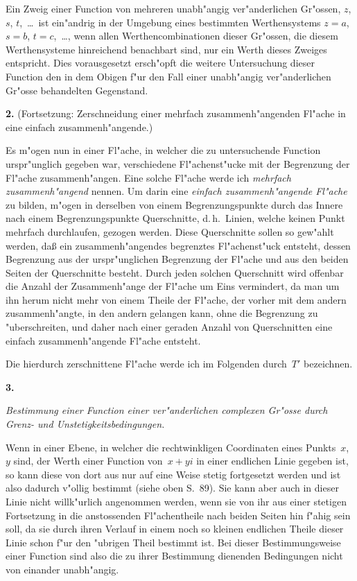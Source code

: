 \documentclass[12pt,a4paper]{article}
\begin{document}
Ein Zweig einer Function von mehreren unabh"angig ver"anderlichen
Gr"ossen, $z$, $s$, $t$,\ \ldots\ ist ein"andrig in der Umgebung eines bestimmten
Werthensystems $z = a$, $s = b$, $t = c$,\ \ldots, wenn allen Werthencombinationen dieser Gr"ossen, die diesem Werthensysteme hinreichend benachbart
sind, nur ein Werth dieses Zweiges entspricht. Dies vorausgesetzt
ersch"opft die weitere Untersuchung dieser Function den in dem Obigen
f"ur den Fall einer unabh"angig ver"anderlichen Gr"osse behandelten
Gegenstand.

\medskip
\textbf{2.} (Fortsetzung: Zerschneidung einer mehrfach zusammenh"angenden
Fl"ache in eine einfach zusammenh"angende.)

Es m"ogen nun in einer Fl"ache, in welcher die zu untersuchende
Function urspr"unglich gegeben war, verschiedene Fl"achenst"ucke mit der
Begrenzung der Fl"ache zusammenh"angen. Eine solche Fl"ache werde
ich \emph{mehrfach zusammenh"angend} nennen. Um darin eine
\emph{einfach zusammenh"angende Fl"ache} zu bilden, m"ogen in derselben
von einem Begrenzungspunkte durch das Innere nach einem Begrenzungspunkte
Querschnitte, d.\,h.\ Linien, welche keinen Punkt mehrfach durchlaufen,
gezogen werden. Diese Querschnitte sollen so gew"ahlt werden, da\ss{}
ein zusammenh"angendes begrenztes Fl"achenst"uck entsteht, dessen
Begrenzung aus der urspr"unglichen Begrenzung der Fl"ache und aus
den beiden Seiten der Querschnitte besteht. Durch jeden solchen
Querschnitt wird offenbar die Anzahl der Zusammenh"ange der Fl"ache
um Eins vermindert, da man um ihn herum nicht mehr von einem
Theile der Fl"ache, der vorher mit dem andern zusammenh"angte, in
den andern gelangen kann, ohne die Begrenzung zu "uberschreiten, und
daher nach einer geraden Anzahl von Querschnitten eine einfach
zusammenh"angende Fl"ache entsteht.

Die hierdurch zerschnittene Fl"ache werde ich im Folgenden durch~$T'$
bezeichnen.

\medskip
\textbf{3.}

\textit{Bestimmung einer Function einer ver"anderlichen complexen Gr"osse
durch Grenz- und Unstetigkeitsbedingungen.}

Wenn in einer Ebene, in welcher die rechtwinkligen Coordinaten eines
Punkts~$x$,~$y$ sind, der Werth einer Function von~$x + yi$ in einer
endlichen Linie gegeben ist, so kann diese von dort aus nur auf eine
Weise stetig fortgesetzt werden und ist also dadurch v"ollig bestimmt
(siehe oben S.~89). Sie kann aber auch in dieser Linie nicht willk"urlich
angenommen werden, wenn sie von ihr aus einer stetigen Fortsetzung in
die anstossenden Fl"achentheile nach beiden Seiten hin f"ahig sein soll,
da sie durch ihren Verlauf in einem noch so kleinen endlichen Theile
dieser Linie schon f"ur den "ubrigen Theil bestimmt ist. Bei dieser
Bestimmungsweise einer Function sind also die zu ihrer Bestimmung
dienenden Bedingungen nicht von einander unabh"angig.
\end{document}
